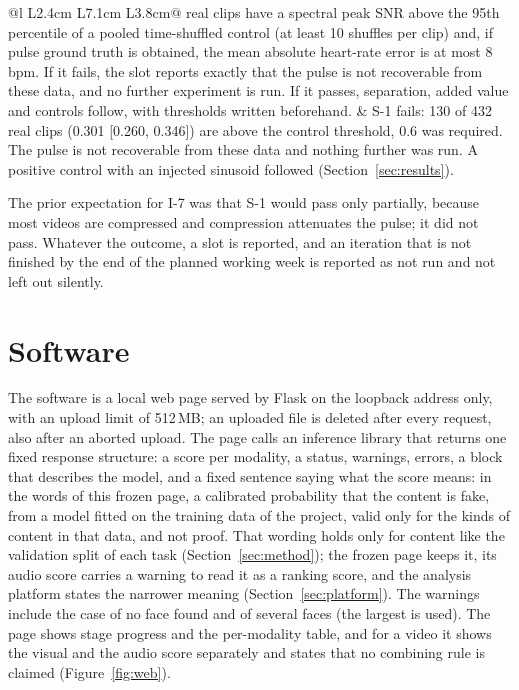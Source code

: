 \documentclass[conference,a4paper]{IEEEtran_nodash}
\begin{document}
\begin{table}[!t]
\begin{tabular}{@{}l L{2.4cm} L{7.1cm} L{3.8cm}@{}}
real clips have a spectral peak SNR above the 95th percentile of a pooled
time-shuffled control (at least 10 shuffles per clip) and, if pulse ground truth
is obtained, the mean absolute heart-rate error is at most 8 bpm. If it fails,
the slot reports exactly that the pulse is not recoverable from these data, and
no further experiment is run. If it passes, separation, added value and
controls follow, with thresholds written beforehand. &
S-1 fails: 130 of 432 real clips (0.301 [0.260, 0.346]) are above the control
threshold, 0.6 was required. The pulse is not recoverable from these data and
nothing further was run. A positive control with an injected sinusoid followed
(Section~\ref{sec:results}). %
\\
\bottomrule
\end{tabular}
\end{table}

The prior expectation for I-7 was that S-1 would pass only partially, because
most videos are compressed and compression attenuates the pulse; it did not
pass. Whatever the outcome, a slot is reported, and an iteration that is not
finished by the end of the planned working week is reported as not run and not
left out silently.

\section{Software}\label{sec:software}

The software is a local web page served by Flask on the loopback address only,
with an upload limit of 512\,MB; an uploaded file is deleted after every
request, also after an aborted upload. The page calls an inference library that
returns one fixed response structure: a score per modality, a status, warnings,
errors, a block that describes the model, and a fixed sentence saying what the
score means: in the words of this frozen page, a calibrated probability that the
content is fake, from a model fitted on the training data of the project, valid
only for the kinds of content in that data, and not proof. That wording holds
only for content like the validation split of each task
(Section~\ref{sec:method}); the frozen page keeps it, its audio score carries a
warning to read it as a ranking score, and the analysis platform states the
narrower meaning (Section~\ref{sec:platform}). The warnings include the case of no face
found and of several faces (the largest is used). The page shows stage progress
and the per-modality table, and for a video it shows the visual and the audio
score separately and states that no combining rule is claimed
(Figure~\ref{fig:web}).
\end{document}
